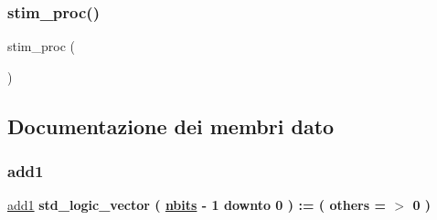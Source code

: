 \subsubsection{\texorpdfstring{stim\+\_\+proc()}{stim\_proc()}}
{\footnotesize\ttfamily stim\+\_\+proc (\begin{DoxyParamCaption}{ }\end{DoxyParamCaption})}



\subsection{Documentazione dei membri dato}
\mbox{\label{classtb__adder_1_1behavior_a1c7a41b72844f6ed4f7cf1ab81102a2a}} 
\subsubsection{\texorpdfstring{add1}{add1}}
{\footnotesize\ttfamily \hyperlink{classtb__adder_1_1behavior_a1c7a41b72844f6ed4f7cf1ab81102a2a}{add1} {\bfseries \textcolor{vhdlchar}{std\+\_\+logic\+\_\+vector}\textcolor{vhdlchar}{ }\textcolor{vhdlchar}{(}\textcolor{vhdlchar}{ }\textcolor{vhdlchar}{ }\textcolor{vhdlchar}{ }\textcolor{vhdlchar}{ }{\bfseries \hyperlink{classtb__adder_1_1behavior_aff8823a253db156c5a7a40d1b813343f}{nbits}} \textcolor{vhdlchar}{-\/}\textcolor{vhdlchar}{ } \textcolor{vhdldigit}{1} \textcolor{vhdlchar}{ }\textcolor{vhdlchar}{downto}\textcolor{vhdlchar}{ }\textcolor{vhdlchar}{ } \textcolor{vhdldigit}{0} \textcolor{vhdlchar}{ }\textcolor{vhdlchar}{)}\textcolor{vhdlchar}{ }\textcolor{vhdlchar}{ }\textcolor{vhdlchar}{ }\textcolor{vhdlchar}{\+:}\textcolor{vhdlchar}{=}\textcolor{vhdlchar}{ }\textcolor{vhdlchar}{(}\textcolor{vhdlchar}{ }\textcolor{vhdlchar}{ }\textcolor{vhdlchar}{others}\textcolor{vhdlchar}{ }\textcolor{vhdlchar}{ }\textcolor{vhdlchar}{=}\textcolor{vhdlchar}{ }\textcolor{vhdlchar}{$>$}\textcolor{vhdlchar}{ }\textcolor{vhdlchar}{\textquotesingle{}}\textcolor{vhdlchar}{ } \textcolor{vhdldigit}{0} \textcolor{vhdlchar}{ }\textcolor{vhdlchar}{\textquotesingle{}}\textcolor{vhdlchar}{ }\textcolor{vhdlchar}{)}\textcolor{vhdlchar}{ }} \hspace{0.3cm}{\ttfamily [Signal]}}

\mbox{\label{classtb__adder_1_1behavior_aa713d21db1284f6652f7e63e60cacaa1}} 
